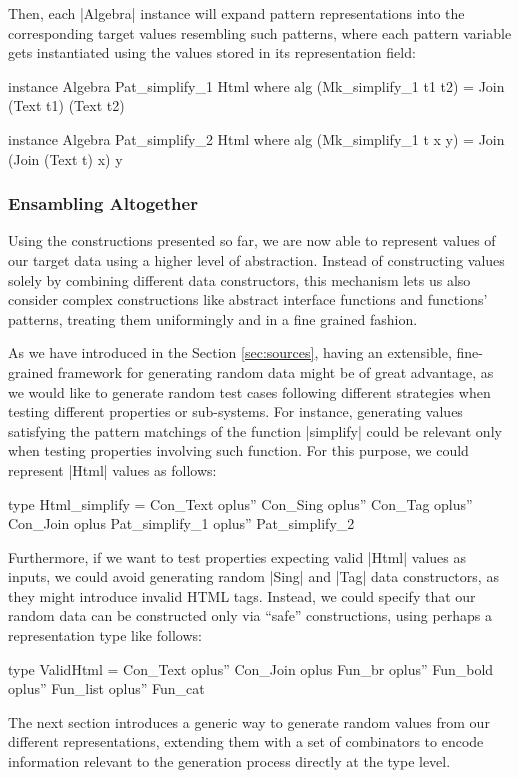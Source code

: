 Then, each |Algebra| instance will expand pattern representations into the
corresponding target values resembling such patterns, where each pattern
variable gets instantiated using the values stored in its representation field:

\begin{code}
instance Algebra Pat_simplify_1 Html where
  alg (Mk_simplify_1 t1 t2) = Join (Text t1) (Text t2)

instance Algebra Pat_simplify_2 Html where
  alg (Mk_simplify_1 t x y) = Join (Join (Text t) x) y
\end{code}


%
%
\subsubsection{Ensambling Altogether}

Using the constructions presented so far, we are now able to represent values of
our target data using a higher level of abstraction.
%
Instead of constructing values solely by combining different data constructors,
this mechanism lets us also consider complex constructions like abstract
interface functions and functions' patterns, treating them uniformingly and in a
fine grained fashion.


As we have introduced in the Section \ref{sec:sources}, having an extensible,
fine-grained framework for generating random data might be of great advantage,
as we would like to generate random test cases following different strategies
when testing different properties or sub-systems.
%
For instance, generating values satisfying the pattern matchings of the function
|simplify| could be relevant only when testing properties involving such
function.
%
For this purpose, we could represent |Html| values as follows:
%
\begin{code}
type Html_simplify  =      Con_Text oplus'' Con_Sing oplus'' Con_Tag oplus'' Con_Join
                    oplus  Pat_simplify_1 oplus'' Pat_simplify_2
\end{code}



Furthermore, if we want to test properties expecting valid |Html| values as
inputs, we could avoid generating random |Sing| and |Tag| data constructors, as
they might introduce invalid HTML tags.
%
Instead, we could specify that our random data can be constructed only via
``safe'' constructions, using perhaps a representation type like follows:

\begin{code}
type ValidHtml  =      Con_Text oplus'' Con_Join
                oplus  Fun_br oplus'' Fun_bold oplus'' Fun_list oplus'' Fun_cat
\end{code}


The next section introduces a generic way to generate random values from our
different representations, extending them with a set of combinators to encode
information relevant to the generation process directly at the type level.
